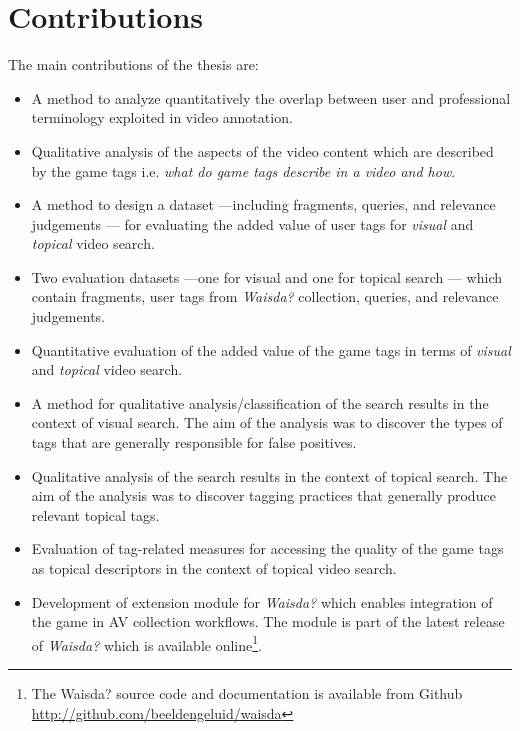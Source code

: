\section{Contributions}
The main contributions of the thesis are:
\begin{itemize}
\item A method to analyze quantitatively the overlap between user and professional terminology exploited in video annotation.
\item Qualitative analysis of the aspects of the video content which are described by the game tags i.e. \textit{what do game tags describe in a video and how}.
\item A method to design a dataset ---including fragments, queries, and relevance judgements --- for evaluating the added value of user tags for \textit{visual} and \textit{topical} video search.
\item Two evaluation datasets ---one for visual and one for topical search --- which contain fragments, user tags from \textit{Waisda?} collection, queries, and relevance judgements.
\item Quantitative evaluation of the added value of the game tags in terms of \textit{visual} and \textit{topical} video search.

\item A method for qualitative analysis/classification of the search results in the context of visual search. The aim of the analysis was to discover the types of tags that are generally responsible for false positives.

\item Qualitative analysis of the search results in the context of topical search. The aim of the analysis was to discover tagging practices that generally produce relevant topical tags.

\item Evaluation of tag-related measures for accessing the quality of the game tags as topical descriptors in the context of topical video search.

\item Development of extension module for \textit{Waisda?} which enables integration of the game in AV collection workflows. The module is part of the latest release of \textit{Waisda?} which is available online\footnote{The Waisda? source code and documentation is available from Github \url{http://github.com/beeldengeluid/waisda}}.
\end{itemize}


